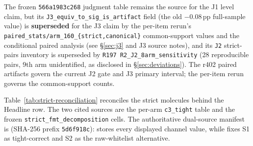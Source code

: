 \documentclass{article}
\begin{document}
The frozen \texttt{566a1983c268} judgment table remains the source for the J1
level claim, but its \texttt{J3\_equiv\_to\_sig\_is\_artifact} field (the old
$-0.08$\,pp full-sample value) is \textbf{superseded} for the J3 claim by the
per-item rerun's \texttt{paired\_stats/arm\_160\_\{strict,canonical\}}
common-support values and the conditional paired analysis
(see \S\ref{sec:j3} and J3 source notes), and its \texttt{J2} strict-pairs
inventory is superseded by \texttt{R197 R2\_J2\_8arm\_sensitivity} (28
reproducible pairs, 9th arm unidentified, as disclosed in
\S\ref{sec:deviations}).  The r402 paired artifacts govern the current J2 gate
and J3 primary interval; the per-item rerun governs the common-support counts.

Table~\ref{tab:strict-reconciliation} reconciles the strict molecules behind
the Headline row.  The two cited sources are the per-arm
\texttt{c3\_tight} table and the frozen
\texttt{strict\_fmt\_decomposition} cells.
The authoritative dual-source manifest is
 (SHA-256 prefix
\texttt{5d6f918c}): 
stores every displayed channel value, while
 fixes S1 as tight-correct and S2 as the
raw-whitelist alternative.
\end{document}
